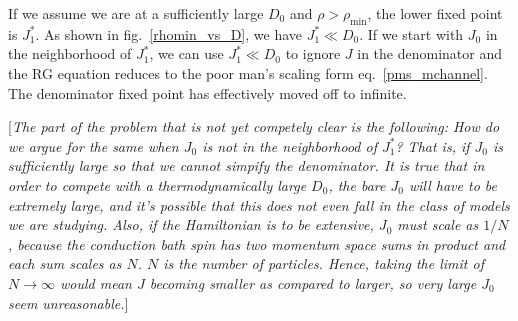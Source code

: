 \documentclass{revtex4-2}
\numberwithin{equation}{section}
\begin{document}
If we assume we are at a sufficiently large \(D_0\) and \(\rho > \rho_\text{min}\), the lower fixed point is \(J_1^*\). As shown in fig.~\ref{rhomin_vs_D}, we have \(J_1^* \ll D_0\). If we start with \(J_0\) in the neighborhood of \(J_1^*\), we can use \(J_1^* \ll D_0\) to ignore \(J\) in the denominator and the RG equation reduces to the poor man's scaling form eq.~\ref{pms_mchannel}. The denominator fixed point has effectively moved off to infinite.

[\textit{The part of the problem that is not yet competely clear is the following: How do we argue for the same when \(J_0\) is not in the neighborhood of \(J_1^*\)? That is, if \(J_0\) is sufficiently large so that we cannot simpify the denominator. It is true that in order to compete with a thermodynamically large \(D_0\), the bare \(J_0\) will have to be extremely large, and it's possible that this does not even fall in the class of models we are studying. Also, if the Hamiltonian is to be extensive, \(J_0\) must scale as \(1/N\), because the conduction bath spin has two momentum space sums in product and each sum scales as \(N\). \(N\) is the number of particles. Hence, taking the limit of \(N \to \infty\) would mean \(J\) becoming smaller as compared to larger, so very large \(J_0\) seem unreasonable.}]
\end{document}
